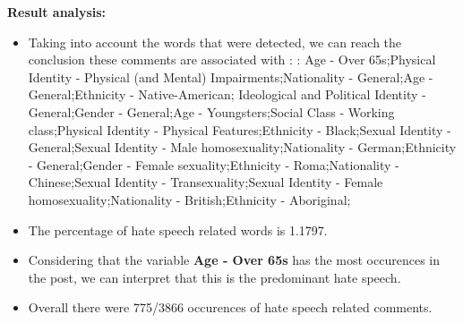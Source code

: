 \documentclass[11pt]{article}
\begin{document}
\textbf{\Large Result analysis:}

\begin{itemize}\item Taking into account the words that were detected, we can reach the conclusion these comments are associated with : : Age - Over 65s;Physical Identity - Physical (and Mental) Impairments;Nationality - General;Age - General;Ethnicity - Native-American; Ideological and Political Identity - General;Gender - General;Age - Youngsters;Social Class - Working class;Physical Identity - Physical Features;Ethnicity - Black;Sexual Identity - General;Sexual Identity - Male homosexuality;Nationality - German;Ethnicity - General;Gender - Female sexuality;Ethnicity - Roma;Nationality - Chinese;Sexual Identity - Transexuality;Sexual Identity - Female homosexuality;Nationality - British;Ethnicity - Aboriginal;%

\item The percentage of hate speech related words is 1.1797.

\item Considering that the variable \textbf{Age - Over 65s} has the most occurences in the post, we can interpret that this is the predominant hate speech.

\item Overall there were 775/3866 occurences of hate speech related comments.\end{itemize}
\end{document}
